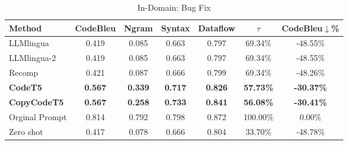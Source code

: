 \begin{table}[!htbp]
\caption{In-Domain: Bug Fix}
\begin{tabular}{l|cccccc}
\hline
Method              & CodeBleu       & Ngram          & Syntax         & Dataflow       & $\tau$ & CodeBleu$\downarrow$\%   \\ \hline
LLMlingua           & 0.419          & 0.085          & 0.663          & 0.797          & 69.34\%                   & -48.55\%          \\
LLMlingua-2           & 0.419          & 0.085          & 0.663          & 0.797          & 69.34\%                   & -48.55\%          \\
Recomp       & 0.421          & 0.087          & 0.666          & 0.799          & 69.34\%                   & -48.26\%          \\
\textbf{CodeT5}     & \textbf{0.567} & \textbf{0.339} & \textbf{0.717} & \textbf{0.826} & \textbf{57.73\%}          & \textbf{-30.37\%} \\
\textbf{CopyCodeT5} & \textbf{0.567} & \textbf{0.258} & \textbf{0.733} & \textbf{0.841} & \textbf{56.08\%}          & \textbf{-30.41\%} \\ \hline
Orginal Prompt      & 0.814          & 0.792          & 0.798          & 0.872          & 100.00\%                  & 0.00\%            \\
Zero shot           & 0.417          & 0.078          & 0.666          & 0.804          & 33.70\%                   & -48.78\%          \\ \hline
\end{tabular}
\end{table}

